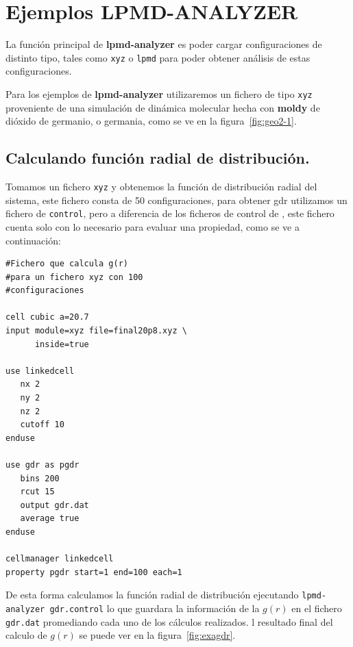 \section{Ejemplos LPMD-ANALYZER}

La funci\'on principal de \textbf{lpmd-analyzer} es poder cargar configuraciones de distinto tipo, tales como \verb|xyz| o \verb|lpmd| para poder obtener an\'alisis de estas configuraciones.

Para los ejemplos de \textbf{lpmd-analyzer} utilizaremos un fichero de tipo \verb|xyz| proveniente de una simulaci\'on de din\'amica molecular hecha con \textbf{moldy} de di\'oxido de germanio, o germania, como se ve en la figura~\ref{fig:geo2-1}.


\subsection{Calculando funci\'on radial de distribuci\'on.}

Tomamos un fichero \verb|xyz| y obtenemos la funci\'on de distribuci\'on radial del sistema, este fichero consta de 50 configuraciones, para obtener gdr utilizamos un fichero de \verb|control|, pero a diferencia de los ficheros de control de \lpmd, este fichero cuenta solo con lo necesario para evaluar una propiedad, como se ve a continuaci\'on:

\begin{multicols}{2}
\setlength{\columnseprule}{.5pt}
\begin{verbatim}
#Fichero que calcula g(r)
#para un fichero xyz con 100 
#configuraciones

cell cubic a=20.7
input module=xyz file=final20p8.xyz \
      inside=true

use linkedcell
   nx 2
   ny 2
   nz 2
   cutoff 10
enduse

use gdr as pgdr
   bins 200
   rcut 15
   output gdr.dat
   average true
enduse

cellmanager linkedcell
property pgdr start=1 end=100 each=1
\end{verbatim}
\end{multicols}

De esta forma calculamos la funci\'on radial de distribuci\'on ejecutando \verb|lpmd-analyzer gdr.control| lo que guardara la informaci\'on de la $g(r)$ en el fichero \verb|gdr.dat| promediando cada uno de los c\'alculos realizados. l resultado final del calculo de $g(r)$ se puede ver en la figura~\ref{fig:exagdr}.


